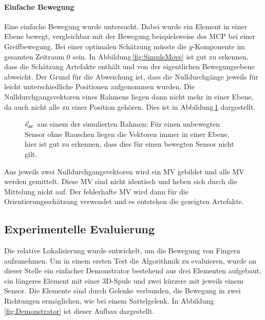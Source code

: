 \paragraph{Einfache Bewegung}
Eine einfache Bewegung wurde untersucht. Dabei wurde ein Element in einer Ebene bewegt, vergleichbar mit der Bewegung beispielsweise des MCP bei einer Greifbewegung. Bei einer optimalen Schätzung müsste die $y$-Komponente im gesamten Zeitraum $0$ sein. In Abbildung\,\ref{fig:SimpleMove} ist gut zu erkennen, dass die Schätzung Artefakte enthält und von der eigentlichen Bewegungsebene abweicht. Der Grund für die Abweichung ist, dass die Nulldurchgänge jeweils für leicht unterschiedliche Positionen aufgenommen wurden. Die Nulldurchgangsvektoren eines Rahmens liegen dann nicht mehr in einer Ebene, da auch nicht alle zu einer Position gehören. Dies ist in Abbildung\,\ref{fig:ZerocrossingsMotion} dargestellt.
\begin{figure}[h]
  \centering
  \caption{$\vec{e}_{\textrm{\footnotesize{zc}}}$ aus einem der simulierten Rahmen: Für einen unbewegten Sensor ohne Rauschen liegen die Vektoren immer in einer Ebene, hier ist gut zu erkennen, dass dies für einen bewegten Sensor nicht gilt.}
  \label{fig:ZerocrossingsMotion}
\end{figure}
Aus jeweils zwei Nulldurchgangsvektoren wird ein MV gebildet und alle MV werden gemittelt. Diese MV sind nicht identisch und heben sich durch die Mittelung nicht auf. Der fehlerhafte MV wird dann für die Orientierungsschätzung verwendet und es entstehen die gezeigten Artefakte.

\subsection{Experimentelle Evaluierung}
Die relative Lokalisierung wurde entwickelt, um die Bewegung von Fingern aufzunehmen. Um in einem ersten Test die Algorithmik zu evaluieren, wurde an dieser Stelle ein einfacher Demonstrator bestehend aus drei Elementen aufgebaut, ein längeres Element mit einer 3D-Spule und zwei kürzere mit jeweils einem Sensor. Die Elemente sind durch Gelenke verbunden, die Bewegung in zwei Richtungen ermöglichen, wie bei einem Sattelgelenk. In Abbildung\,\ref{fig:Demonstrator} ist dieser Aufbau dargestellt.

